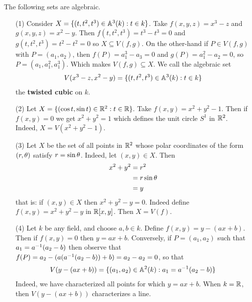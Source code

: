 \begin{example}\label{example_10.2}
  The following sets are algebraic.
  \begin{enumerate}
    \item[(1)] Consider $X=\{(t, t^2, t^3) \in \mathbb{A}^3(k) : t \in k\}$.
      Take $f(x,y,z)=x^3-z$ and $g(x,y,z)=x^2-y$. Then
      $f(t,t^2,t^3)=t^3-t^3=0$ and $g(t,t^2,t^3)=t^2-t^2=0$ so
      $X \subseteq V(f,g)$. On the other-hand if $P \in V(f,g)$ with
      $P=(a_1, a_2)$, then $f(P)=a_1^3-a_3=0$ and $g(P)=a_1^2-a_2=0$, so
      $P=(a_1, a_1^2, a_1^3)$. Which makes $V(f,g) \subseteq X$. We call
      the algebraic set
      \begin{equation*}
        V(x^3-z,x^2-y)=\{(t,t^2,t^3) \in \mathbb{A}^3(k): t \in k\}
      \end{equation*}
      the \textbf{twisted cubic} on $k$.

    \item[(2)] Let $X=\{(\cos{t}, \sin{t}) \in \mathbb{R}^2 : t \in \mathbb{R}\}$.
      Take $f(x,y)=x^2+y^2-1$. Then if $f(x,y)=0$ we get $x^2+y^2=1$
      which defines the unit circle $S^1$ in $\mathbb{R}^2$. Indeed,
      $X=V(x^2+y^2-1)$.

    \item[(3)] Let $X$ be the set of all points in $\mathbb{R}^2$ whose polar
      coordinates of the form $(r,\theta)$ satisfy $r=\sin{\theta}$. Indeed,
      let $(x,y) \in X$. Then
      \begin{align*}
        x^2+y^2 &= r^2 \\
                &= r\sin{\theta} \\
                &= y \\
      \end{align*}
      that is: if $(x,y) \in X$ then $x^2+y^2-y=0$. Indeed define
      $f(x,y)=x^2+y^2-y$ in $\mathbb{R}[x,y]$. Then $X=V(f)$.

    \item[(4)] Let $k$ be any field, and choose $a,b \in k$. Define
      $f(x,y)=y-(ax+b)$. Then if $f(x,y)=0$ then $y=ax+b$. Conversely,
      if $P=(a_1, a_2)$ such that $a_1=a^{-1}(a_2-b)$ then observe
      that $f(P)=a_2-(a(a^{-1}(a_2-b))+b)=a_2-a_2=0$, so that
      \begin{equation*}
        V(y-(ax+b))=\{(a_1,a_2) \in \mathbb{A}^2(k) : a_1=a^{-1}(a_2-b)\}
      \end{equation*}
      Indeed, we have characterized all points for which $y=ax+b$.
      When $k=\mathbb{R}$, then $V(y-(ax+b))$ characterizes a line.
  \end{enumerate}
\end{example}

